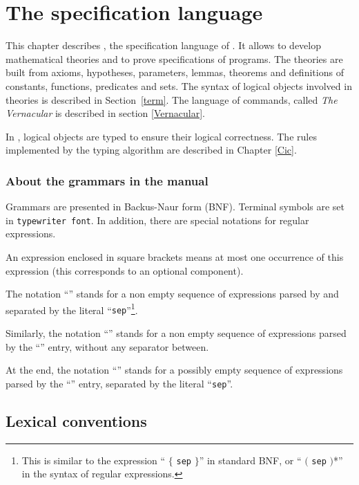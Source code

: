 \chapter{The \gallina{} specification language
\label{Gallina}}
\label{BNF-syntax} %

This chapter describes \gallina, the specification language of {\Coq}.
It allows to develop mathematical theories and to prove specifications
of programs.  The theories are built from axioms, hypotheses,
parameters, lemmas, theorems and definitions of constants, functions,
predicates and sets. The syntax of logical objects involved in
theories is described in Section~\ref{term}. The language of
commands, called {\em The Vernacular} is described in section
\ref{Vernacular}.

In {\Coq}, logical objects are typed to ensure their logical
correctness. The rules implemented by the typing algorithm are described in
Chapter \ref{Cic}.

\subsection*{About the grammars in the manual
}

Grammars are presented in Backus-Naur form (BNF). Terminal symbols are
set in {\tt typewriter font}.  In addition, there are special
notations for regular expressions.

An expression enclosed in square brackets \zeroone{\ldots} means at
most one occurrence of this expression (this corresponds to an
optional component).

The notation ``'' stands for a non empty
sequence of expressions parsed by {\entry} and
separated by the literal ``{\tt sep}''\footnote{This is similar to the
expression ``{\entry} $\{$ {\tt sep} {\entry} $\}$'' in
standard BNF, or ``{\entry} $($ {\tt sep} {\entry} $)$*'' in
the syntax of regular expressions.}.

Similarly, the notation ``\nelist{\entry}{}'' stands for a non
empty sequence of expressions parsed by the ``{\entry}'' entry,
without any separator between.

At the end, the notation ``'' stands for a
possibly empty sequence of expressions parsed by the ``{\entry}'' entry,
separated by the literal ``{\tt sep}''.

\section{Lexical conventions
\label{lexical}}


